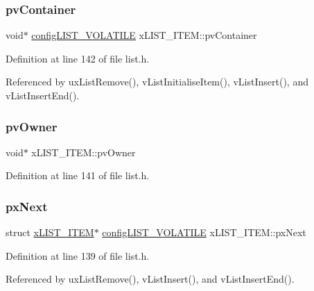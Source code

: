 \subsubsection{\texorpdfstring{pv\+Container}{pvContainer}}
{\footnotesize\ttfamily void$\ast$ \hyperlink{list_8h_a2d5de557c5561c8980d1bf51d87d8cba}{config\+L\+I\+S\+T\+\_\+\+V\+O\+L\+A\+T\+I\+LE} x\+L\+I\+S\+T\+\_\+\+I\+T\+E\+M\+::pv\+Container}



Definition at line 142 of file list.\+h.



Referenced by ux\+List\+Remove(), v\+List\+Initialise\+Item(), v\+List\+Insert(), and v\+List\+Insert\+End().

\mbox{\label{structxLIST__ITEM_aeb3110b50fe0dbce826d929b27b5ddb1}} 
\subsubsection{\texorpdfstring{pv\+Owner}{pvOwner}}
{\footnotesize\ttfamily void$\ast$ x\+L\+I\+S\+T\+\_\+\+I\+T\+E\+M\+::pv\+Owner}



Definition at line 141 of file list.\+h.

\mbox{\label{structxLIST__ITEM_a03713c4ee953ef5ca6adbec883720c60}} 
\subsubsection{\texorpdfstring{px\+Next}{pxNext}}
{\footnotesize\ttfamily struct \hyperlink{structxLIST__ITEM}{x\+L\+I\+S\+T\+\_\+\+I\+T\+EM}$\ast$ \hyperlink{list_8h_a2d5de557c5561c8980d1bf51d87d8cba}{config\+L\+I\+S\+T\+\_\+\+V\+O\+L\+A\+T\+I\+LE} x\+L\+I\+S\+T\+\_\+\+I\+T\+E\+M\+::px\+Next}



Definition at line 139 of file list.\+h.



Referenced by ux\+List\+Remove(), v\+List\+Insert(), and v\+List\+Insert\+End().

